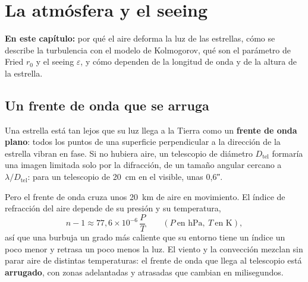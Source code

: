 \chapter{La atmósfera y el seeing}\label{cap:atmosfera}

\begin{resumen}
\textbf{En este capítulo:} por qué el aire deforma la luz de las estrellas, cómo se describe la turbulencia con el
modelo de Kolmogorov, qué son el parámetro de Fried $r_0$ y el seeing $\varepsilon$, y cómo dependen de la longitud de
onda y de la altura de la estrella.
\end{resumen}

\section{Un frente de onda que se arruga}

Una estrella está tan lejos que su luz llega a la Tierra como un \textbf{frente de onda plano}: todos los puntos de una
superficie perpendicular a la dirección de la estrella vibran en fase. Si no hubiera aire, un telescopio de diámetro
$D_\text{tel}$ formaría una imagen limitada solo por la difracción, de un tamaño angular cercano a $\lambda/D_\text{tel}$:
para un telescopio de 20~cm en el visible, unas 0,6″.

Pero el frente de onda cruza unos 20~km de aire en movimiento. El índice de refracción del aire depende de su presión y su
temperatura,
\begin{equation}
n - 1 \approx 77{,}6\times10^{-6}\,\frac{P}{T}\qquad(P\ \text{en hPa},\ T\ \text{en K}),
\end{equation}
así que una burbuja un grado más caliente que su entorno tiene un índice un poco menor y retrasa un poco menos la luz. El
viento y la convección mezclan sin parar aire de distintas temperaturas: el frente de onda que llega al telescopio está
\textbf{arrugado}, con zonas adelantadas y atrasadas que cambian en milisegundos.

